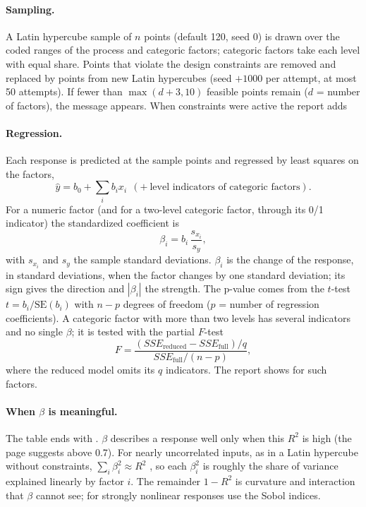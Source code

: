 \paragraph{Sampling.} A Latin hypercube sample \citep{mckay1979,stein1987} of $n$ points (default 120, seed 0) is
drawn over the coded ranges of the process and categoric factors; categoric factors take each level with equal share.
Points that violate the design constraints are removed and replaced by points from new Latin hypercubes (seed
$+1000$ per attempt, at most 50 attempts). If fewer than $\max(d+3,10)$ feasible points remain ($d$ = number of
factors), the message  appears. When constraints
were active the report adds 

\paragraph{Regression.} Each response is predicted at the sample points and regressed by least squares on the
factors,
\begin{equation}
\hat y=b_0+\sum_i b_i x_i\ \ (+\ \text{level indicators of categoric factors}).
\label{eq:ch09-linreg}
\end{equation}
For a numeric factor (and for a two-level categoric factor, through its 0/1 indicator) the standardized coefficient
is
\begin{equation}
\beta_i=b_i\,\frac{s_{x_i}}{s_y},
\label{eq:ch09-beta}
\end{equation}
with $s_{x_i}$ and $s_y$ the sample standard deviations. $\beta_i$ is the change of the response, in standard
deviations, when the factor changes by one standard deviation; its sign gives the direction and $|\beta_i|$ the
strength. The p-value comes from the $t$-test $t=b_i/\text{SE}(b_i)$ with $n-p$ degrees of freedom ($p$ = number of
regression coefficients). A categoric factor with more than two levels has several indicators and no single $\beta$;
it is tested with the partial $F$-test
\begin{equation}
F=\frac{(SSE_\text{reduced}-SSE_\text{full})/q}{SSE_\text{full}/(n-p)},
\label{eq:ch09-ftest}
\end{equation}
where the reduced model omits its $q$ indicators. The report shows  for such factors.

\paragraph{When $\beta$ is meaningful.} The table ends with . $\beta$ describes a
response well only when this $R^2$ is high (the page suggests above 0.7). For nearly uncorrelated inputs, as in a Latin
hypercube without constraints, $\sum_i\beta_i^2\approx R^2$ \citep{saltelli2008}, so each $\beta_i^2$ is roughly the
share of variance explained linearly by factor $i$. The remainder $1-R^2$ is curvature and interaction that $\beta$
cannot see; for strongly nonlinear responses use the Sobol indices.

